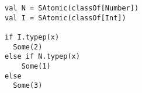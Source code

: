 \begin{lstlisting}[style=reclojureScala]
val N = SAtomic(classOf[Number])
val I = SAtomic(classOf[Int])

if I.typep(x)
  Some(2)
else if N.typep(x)
    Some(1)
else
  Some(3)
\end{lstlisting}
